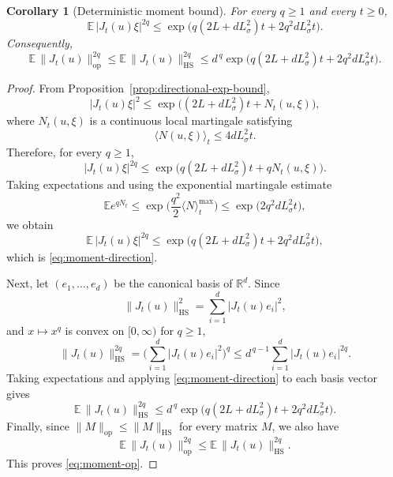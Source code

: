 \documentclass{tsp-short}
\newtheorem{corollary}{Corollary}[section]
\theoremstyle{remark}
\theoremstyle{definition}
\begin{document}
\begin{corollary}[Deterministic moment bound]\label{cor:moment-bound}
For every $q\ge 1$ and every $t\ge0$,
\begin{equation}\label{eq:moment-direction}
\mathbb{E}\,|J_t(u)\xi|^{2q}
\le \exp\Big(q(2L+dL_\sigma^2)t + 2q^2 dL_\sigma^2 t\Big).
\end{equation}
Consequently,
\begin{equation}\label{eq:moment-op}
\mathbb{E}\,\|J_t(u)\|_{\mathrm{op}}^{2q}
\le \mathbb{E}\,\|J_t(u)\|_{\mathrm{HS}}^{2q}
\le d^{\,q}\exp\Big(q(2L+dL_\sigma^2)t + 2q^2 dL_\sigma^2 t\Big).
\end{equation}
\end{corollary}

\begin{proof}
From Proposition~\ref{prop:directional-exp-bound},
\begin{equation*}
|J_t(u)\xi|^{2}
\le \exp\Big((2L+dL_\sigma^2)t+N_t(u,\xi)\Big),
\end{equation*}
where $N_t(u,\xi)$ is a continuous local martingale satisfying
\begin{equation*}
\langle N(u,\xi)\rangle_t\le 4dL_\sigma^2 t.
\end{equation*}
Therefore, for every $q\ge1$,
\begin{equation*}
|J_t(u)\xi|^{2q}
\le \exp\Big(q(2L+dL_\sigma^2)t+qN_t(u,\xi)\Big).
\end{equation*}
Taking expectations and using the exponential martingale estimate
\begin{equation*}
\mathbb{E}e^{qN_t}
\le \exp\Big(\frac{q^2}{2}\langle N\rangle_t^{\max}\Big)
\le \exp\big(2q^2 dL_\sigma^2 t\big),
\end{equation*}
we obtain
\begin{equation*}
\mathbb{E}\,|J_t(u)\xi|^{2q}
\le \exp\Big(q(2L+dL_\sigma^2)t+2q^2dL_\sigma^2 t\Big),
\end{equation*}
which is \eqref{eq:moment-direction}.

Next, let $(e_1,\dots,e_d)$ be the canonical basis of $\mathbb{R}^d$. Since
\begin{equation*}
\|J_t(u)\|_{\mathrm{HS}}^2=\sum_{i=1}^d |J_t(u)e_i|^2,
\end{equation*}
and $x\mapsto x^q$ is convex on $[0,\infty)$ for $q\ge1$,
\begin{equation*}
\|J_t(u)\|_{\mathrm{HS}}^{2q}
=\Big(\sum_{i=1}^d |J_t(u)e_i|^2\Big)^q
\le d^{\,q-1}\sum_{i=1}^d |J_t(u)e_i|^{2q}.
\end{equation*}
Taking expectations and applying \eqref{eq:moment-direction} to each basis vector gives
\begin{equation*}
\mathbb{E}\,\|J_t(u)\|_{\mathrm{HS}}^{2q}
\le d^{\,q}\exp\Big(q(2L+dL_\sigma^2)t+2q^2 dL_\sigma^2 t\Big).
\end{equation*}
Finally, since $\|M\|_{\mathrm{op}}\le \|M\|_{\mathrm{HS}}$ for every matrix $M$, we also have
\begin{equation*}
\mathbb{E}\,\|J_t(u)\|_{\mathrm{op}}^{2q}
\le
\mathbb{E}\,\|J_t(u)\|_{\mathrm{HS}}^{2q}.
\end{equation*}
This proves \eqref{eq:moment-op}.
\end{proof}
\end{document}
